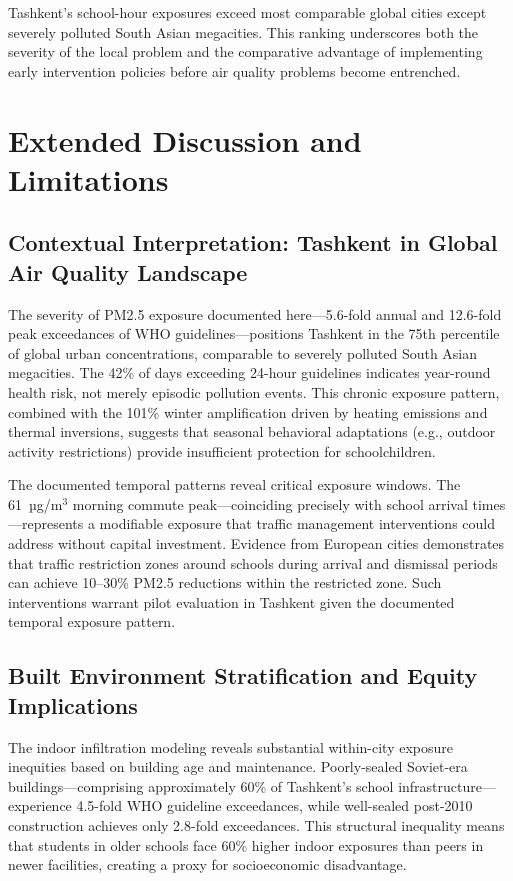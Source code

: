 \documentclass[11pt,a4paper]{article}
\begin{document}
Tashkent's school-hour exposures exceed most comparable global cities except severely polluted South Asian megacities. This ranking underscores both the severity of the local problem and the comparative advantage of implementing early intervention policies before air quality problems become entrenched.

\section{Extended Discussion and Limitations}

\subsection{Contextual Interpretation: Tashkent in Global Air Quality Landscape}

The severity of PM2.5 exposure documented here---5.6-fold annual and 12.6-fold peak exceedances of WHO guidelines---positions Tashkent in the 75th percentile of global urban concentrations, comparable to severely polluted South Asian megacities. The 42\% of days exceeding 24-hour guidelines indicates year-round health risk, not merely episodic pollution events. This chronic exposure pattern, combined with the 101\% winter amplification driven by heating emissions and thermal inversions, suggests that seasonal behavioral adaptations (e.g., outdoor activity restrictions) provide insufficient protection for schoolchildren.

The documented temporal patterns reveal critical exposure windows. The 61~µg/m$^3$ morning commute peak---coinciding precisely with school arrival times---represents a modifiable exposure that traffic management interventions could address without capital investment. Evidence from European cities demonstrates that traffic restriction zones around schools during arrival and dismissal periods can achieve 10--30\% PM2.5 reductions within the restricted zone. Such interventions warrant pilot evaluation in Tashkent given the documented temporal exposure pattern.

\subsection{Built Environment Stratification and Equity Implications}

The indoor infiltration modeling reveals substantial within-city exposure inequities based on building age and maintenance. Poorly-sealed Soviet-era buildings---comprising approximately 60\% of Tashkent's school infrastructure---experience 4.5-fold WHO guideline exceedances, while well-sealed post-2010 construction achieves only 2.8-fold exceedances. This structural inequality means that students in older schools face 60\% higher indoor exposures than peers in newer facilities, creating a proxy for socioeconomic disadvantage.
\end{document}
